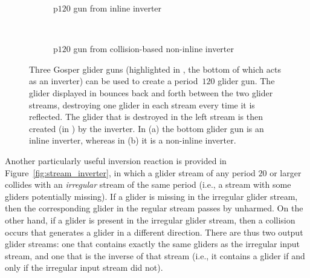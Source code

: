 \begin{figure}[!htb]
	\centering
	\begin{subfigure}{.48\textwidth}
		\centering
		\caption{p$120$ gun from inline inverter}
		\label{fig:inline_inverter_p120_gun}
	\end{subfigure} \ \ \ %
	\begin{subfigure}{.49\textwidth}
		\centering
		\caption{p$120$ gun from collision-based non-inline inverter}
		\label{fig:inverter_p120_gun}
	\end{subfigure}
	\caption{Three Gosper glider guns (highlighted in , the bottom of which acts as an inverter) can be used to create a period~$120$ glider gun. The glider displayed in  bounces back and forth between the two  glider streams, destroying one glider in each stream every time it is reflected. The glider that is destroyed in the left stream is then created (in ) by the inverter. In (a) the bottom glider gun is an inline inverter, whereas in (b) it is a non-inline inverter.}\label{fig:inverter_p120_gun_inline_and_not}
\end{figure}

Another particularly useful inversion reaction is provided in Figure~\ref{fig:stream_inverter}, in which a glider stream of any period $20$ or larger collides with an \emph{irregular} stream of the same period (i.e., a stream with some gliders potentially missing). If a glider is missing in the irregular glider stream, then the corresponding glider in the regular stream passes by unharmed. On the other hand, if a glider is present in the irregular glider stream, then a collision occurs that generates a glider in a different direction. There are thus two output glider streams: one that contains exactly the same gliders as the irregular input stream, and one that is the inverse of that stream (i.e., it contains a glider if and only if the irregular input stream did not).

